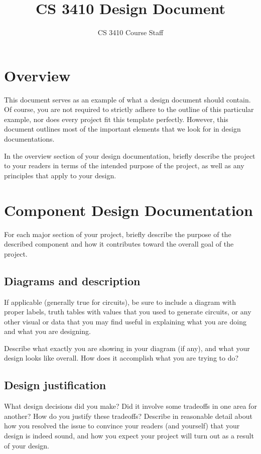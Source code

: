 \documentclass[11pt]{article}
\begin{document}
\title{CS 3410 Design Document}
\author{CS 3410 Course Staff}
\maketitle

\section{Overview}
This document serves as an example of what a design document should contain. Of course, you are not required to strictly adhere to the outline of this particular example, nor does every project fit this template perfectly. However, this document outlines most of the important elements that we look for in design documentations.

In the overview section of your design documentation, briefly describe the project to your readers in terms of the intended purpose of the project, as well as any principles that apply to your design.

\section{Component Design Documentation}
	For each major section of your project, briefly describe the purpose of the described component and how it contributes toward the overall goal of the project.

	\subsection{Diagrams and description}
	If applicable (generally true for circuits), be sure to include a diagram with proper labels, truth tables with values that you used to generate circuits, or any other visual or data that you may find useful in explaining what you are doing and what you are designing.

	Describe what exactly you are showing in your diagram (if any), and what your design looks like overall. How does it accomplish what you are trying to do?

	\subsection{Design justification}
	What design decisions did you make? Did it involve some tradeoffs in one area for another? How do you justify these tradeoffs? Describe in reasonable detail about how you resolved the issue to convince your readers (and yourself) that your design is indeed sound, and how you expect your project will turn out as a result of your design.
\end{document}
